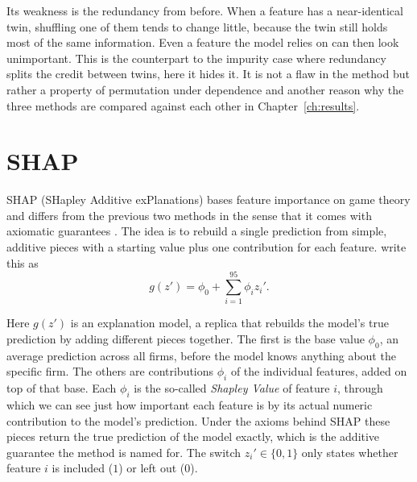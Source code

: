Its weakness is the redundancy from before. When a feature has a near-identical
twin, shuffling one of them tends to change little, because the twin still holds most of the
same information. Even a feature the model relies on can then look
unimportant. This is the counterpart to the impurity case where redundancy splits
the credit between twins, here it hides it. It is not a flaw in the method but 
rather a property of permutation under dependence and another reason why the three 
methods are compared against each other in Chapter~\ref{ch:results}.

\section{SHAP}
\label{sec:fi-shap}

SHAP (SHapley Additive exPlanations) bases feature importance on game theory and
differs from the previous two methods in the sense that it comes with axiomatic
guarantees \parencite{lundberg2017}. The idea is to rebuild a single prediction from
simple, additive pieces with a starting value plus one contribution for each feature.
\textcite{lundberg2017} write this as
\begin{equation}
  g(z') = \phi_0 + \sum_{i=1}^{95} \phi_i z_i'.
  \label{eq:shap-additive}
\end{equation}

Here $g(z')$ is an explanation model, a replica that rebuilds the model's true
prediction by adding different pieces together. The first is the base value $\phi_0$,
an average prediction across all firms, before the model knows anything about the
specific firm. The others are contributions $\phi_i$ of the individual features,
added on top of that base. Each $\phi_i$ is the so-called \emph{Shapley Value} of feature $i$, through which we can see
just how important each feature is by its actual numeric contribution to the model's
prediction. Under the axioms behind SHAP these pieces return the true
prediction of the model exactly, which is the additive guarantee the method is named
for. The switch $z_i' \in \{0,1\}$ only states whether
feature $i$ is included ($1$) or left out ($0$).

